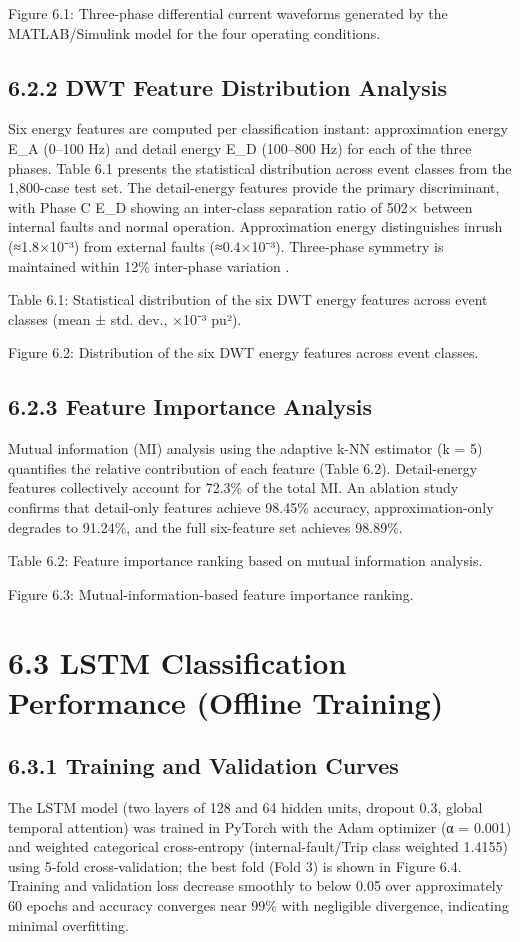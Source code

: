 Figure 6.1: Three-phase differential current waveforms generated by the MATLAB/Simulink model for the four operating conditions.


\subsection{6.2.2  DWT Feature Distribution Analysis}
Six energy features are computed per classification instant: approximation energy E\_A (0--100 Hz) and detail energy E\_D (100--800 Hz) for each of the three phases. Table 6.1 presents the statistical distribution across event classes from the 1,800-case test set. The detail-energy features provide the primary discriminant, with Phase C E\_D showing an inter-class separation ratio of 502× between internal faults and normal operation. Approximation energy distinguishes inrush (≈1.8×10⁻³) from external faults (≈0.4×10⁻³). Three-phase symmetry is maintained within 12\% inter-phase variation \cite{ref5}.

Table 6.1: Statistical distribution of the six DWT energy features across event classes (mean ± std. dev., ×10⁻³ pu²).

Figure 6.2: Distribution of the six DWT energy features across event classes.


\subsection{6.2.3  Feature Importance Analysis}
Mutual information (MI) analysis using the adaptive k-NN estimator (k = 5) quantifies the relative contribution of each feature (Table 6.2). Detail-energy features collectively account for 72.3\% of the total MI. An ablation study confirms that detail-only features achieve 98.45\% accuracy, approximation-only degrades to 91.24\%, and the full six-feature set achieves 98.89\%.

Table 6.2: Feature importance ranking based on mutual information analysis.

Figure 6.3: Mutual-information-based feature importance ranking.


\section{6.3  LSTM Classification Performance (Offline Training)}

\subsection{6.3.1  Training and Validation Curves}
The LSTM model (two layers of 128 and 64 hidden units, dropout 0.3, global temporal attention) was trained in PyTorch with the Adam optimizer (α = 0.001) and weighted categorical cross-entropy (internal-fault/Trip class weighted 1.4155) using 5-fold cross-validation; the best fold (Fold 3) is shown in Figure 6.4. Training and validation loss decrease smoothly to below 0.05 over approximately 60 epochs and accuracy converges near 99\% with negligible divergence, indicating minimal overfitting.

